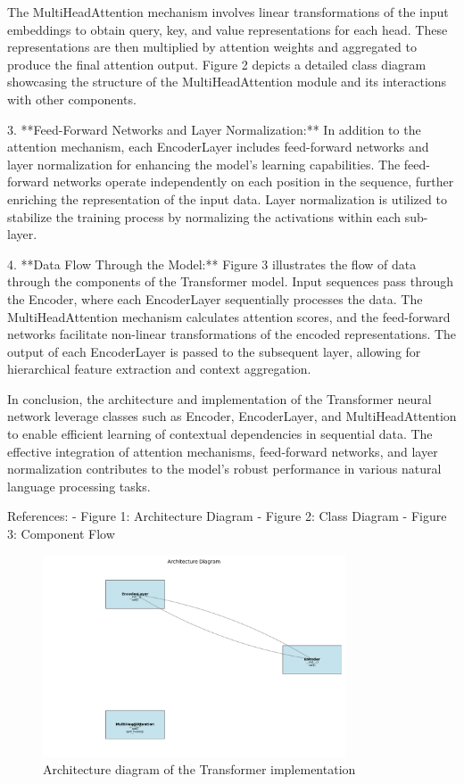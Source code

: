 \documentclass[10pt,journal,compsoc]{IEEEtran}
\begin{document}
The MultiHeadAttention mechanism involves linear transformations of the input embeddings to obtain query, key, and value representations for each head. These representations are then multiplied by attention weights and aggregated to produce the final attention output. Figure 2 depicts a detailed class diagram showcasing the structure of the MultiHeadAttention module and its interactions with other components.

3. **Feed-Forward Networks and Layer Normalization:**
In addition to the attention mechanism, each EncoderLayer includes feed-forward networks and layer normalization for enhancing the model's learning capabilities. The feed-forward networks operate independently on each position in the sequence, further enriching the representation of the input data. Layer normalization is utilized to stabilize the training process by normalizing the activations within each sub-layer.

4. **Data Flow Through the Model:**
Figure 3 illustrates the flow of data through the components of the Transformer model. Input sequences pass through the Encoder, where each EncoderLayer sequentially processes the data. The MultiHeadAttention mechanism calculates attention scores, and the feed-forward networks facilitate non-linear transformations of the encoded representations. The output of each EncoderLayer is passed to the subsequent layer, allowing for hierarchical feature extraction and context aggregation.

In conclusion, the architecture and implementation of the Transformer neural network leverage classes such as Encoder, EncoderLayer, and MultiHeadAttention to enable efficient learning of contextual dependencies in sequential data. The effective integration of attention mechanisms, feed-forward networks, and layer normalization contributes to the model's robust performance in various natural language processing tasks.

References:
- Figure 1: Architecture Diagram
- Figure 2: Class Diagram
- Figure 3: Component Flow

\begin{figure}[h]
\centering
\includegraphics[width=0.8\textwidth]{figures/architecture_diagram.png}
\caption{Architecture diagram of the Transformer implementation}
\label{fig:architecture}
\end{figure}
\end{document}
